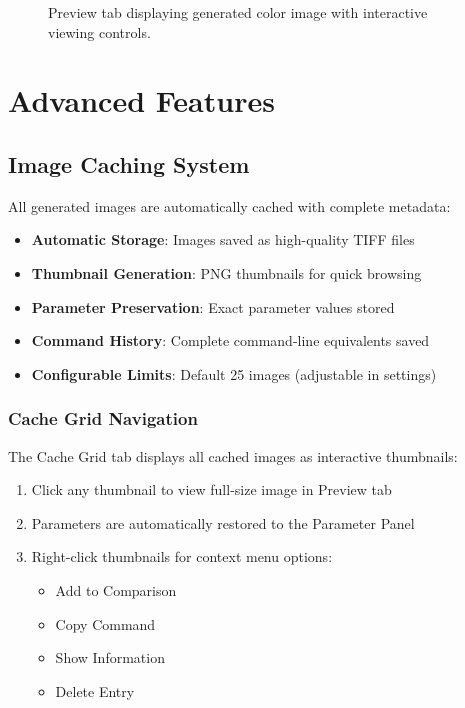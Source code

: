 \documentclass[11pt,a4paper]{article}
\begin{document}
\begin{figure}[H]
\centering
\caption{Preview tab displaying generated color image with interactive
viewing controls.}
\label{fig:preview-tab}
\end{figure}

\section{Advanced Features}

\subsection{Image Caching System}

All generated images are automatically cached with complete metadata:

\begin{itemize}[leftmargin=*]
\item \textbf{Automatic Storage}: Images saved as high-quality TIFF files
\item \textbf{Thumbnail Generation}: PNG thumbnails for quick browsing
\item \textbf{Parameter Preservation}: Exact parameter values stored
\item \textbf{Command History}: Complete command-line equivalents saved
\item \textbf{Configurable Limits}: Default 25 images (adjustable in
settings)
\end{itemize}

\subsubsection{Cache Grid Navigation}

The Cache Grid tab displays all cached images as interactive thumbnails:

\begin{enumerate}
\item Click any thumbnail to view full-size image in Preview tab
\item Parameters are automatically restored to the Parameter Panel
\item Right-click thumbnails for context menu options:
   \begin{itemize}
   \item Add to Comparison
   \item Copy Command
   \item Show Information
   \item Delete Entry
   \end{itemize}
\end{enumerate}
\end{document}
